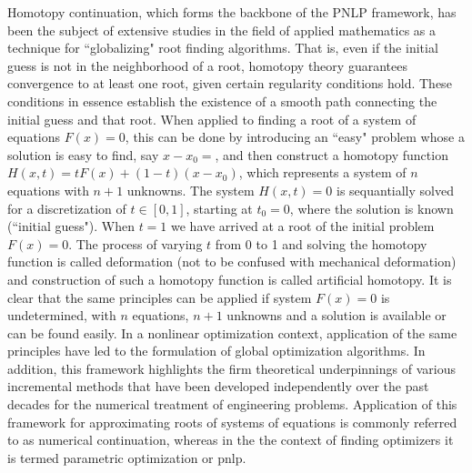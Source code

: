 Homotopy continuation, which forms the backbone of the PNLP framework, has been 
the subject of extensive studies in the field of applied 
mathematics\cite{Allgower:2003,Rheinboldt:2000,Keller:1978,Li:1980,Chow:1978,Chow:1979,
Watson:1989,Watson:1990,Allgower:1981,Rheinboldt:1980,Rheinboldt:1983,Wayburn:1987}
as a technique for ``globalizing" root finding 
algorithms. That is, even if the initial guess is not in the neighborhood of a 
root, homotopy theory guarantees convergence to at least one root, given 
certain regularity conditions hold. These conditions in essence establish the 
existence of a smooth path connecting the initial guess and that root.  When 
applied to finding a root of a system of equations $F(x)=0$, this can be done 
by introducing an ``easy" problem whose a solution is easy to find, say 
$x-x_0=$, and then construct a homotopy function $H(x,t) = tF(x)+(1-t)(x-x_0)$, 
which represents a system of $n$ equations with $n+1$ unknowns. The system  
$H(x,t)=0$ is sequantially solved for a discretization of $t\in[0,1]$, starting 
at $t_0=0$, where the solution is known (``initial guess"). When $t=1$ we have 
arrived at a root of the initial problem $F(x)=0$. The process of varying $t$ 
from 0 to 1 and solving the homotopy function is called deformation (not to be 
confused with mechanical deformation) and construction of such a homotopy 
function is called artificial homotopy.  It is clear that the same principles 
can be applied if system $F(x)=0$ is undetermined, with $n$ equations, $n+1$ 
unknowns and a solution is available or can be found easily. In a nonlinear 
optimization context, application of the same principles have led to the 
formulation of global optimization 
algorithms\cite{Kojima:1984,Gfrerer:1985,Guddat:1990,Gfrerer:1983,Zangwill:1981,Poore:1990,
Jongen:1990,Tiahrt:1989}. In addition, this 
framework highlights the firm theoretical
underpinnings of various incremental methods that
have been developed independently over the past decades for the numerical 
treatment 
of engineering 
problems\cite{Crisfield3,Wempner:1971,Bergan:1978,Bergan:1978b,Batoz:1979,Riks:1979,
Ramm:1981,Watson:1985,Sideris:2017,Byrne:1985,Ushida:1984,Borkovsky:2010,Besanko:2010,
Herings:2010,Bartovn:2016,Barendrecht:2018}. Application of this framework for 
approximating roots 
of systems of equations is commonly referred to as numerical continuation, 
whereas in the the context of finding optimizers it is termed parametric 
optimization or \acrshort{pnlp}.
  
